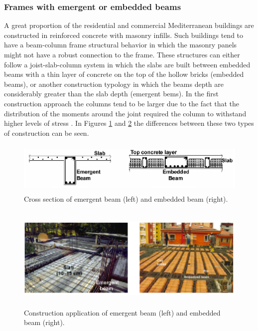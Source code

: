 \subsubsection{Frames with emergent or embedded beams}
A great proportion of the residential and commercial Mediterranean buildings are constructed in reinforced concrete with masonry infills. Such buildings tend to have a beam-column frame structural behavior in which the masonry panels might not have a robust connection to the frame. These structures can either follow a joist-slab-column system in which the slabs are built between embedded beams with a thin layer of concrete on the top of the hollow bricks (embedded beams), or another construction typology in which the beams depth are considerably greater than the slab depth (emergent bems). In the first construction approach the columns tend to be larger due to the fact that the distribution of the moments around the joint required the column to withstand higher levels of stress \citep{Baletal2010}. In Figures \ref{fig:beam_sections} and \ref{fig:beam_construction} the differences between these two types of construction can be seen.

\begin{figure}[ht]
\centering
\includegraphics[width=14cm,height=2.5cm]{./Figures/Part_Risk/beam_types_sections.eps}
\caption{Cross section of emergent beam (left) and embedded beam (right)\citep{Baletal2010}.}
\label{fig:beam_sections}
\end{figure}

\begin{figure}[ht]
\centering
\includegraphics[width=14cm,height=5cm]{./Figures/Part_Risk/beam_types_construction.eps}
\caption{Construction application of emergent beam (left) and embedded beam (right)\citep{Baletal2010}.}
\label{fig:beam_construction}
\end{figure}

